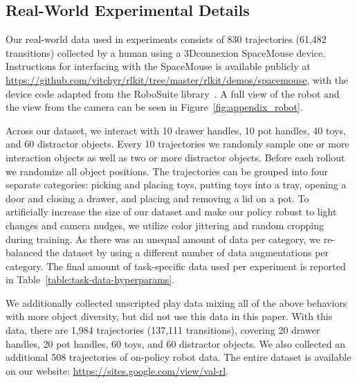\documentclass[letterpaper, 10 pt, conference]{ieeeconf}  %
\begin{document}
{ \small


}

\clearpage
\newpage

\appendix

\subsection{Real-World Experimental Details} \label{sec:appendix_real}

Our real-world data used in experiments consists of 830 trajectories (61,482 transitions) collected by a human using a 3Dconnexion SpaceMouse device. Instructions for interfacing with the SpaceMouse is available publicly at \url{https://github.com/vitchyr/rlkit/tree/master/rlkit/demos/spacemouse}, with the device code adapted from the RoboSuite library~\cite{robosuite2020}. A full view of the robot and the view from the camera can be seen in Figure~\ref{fig:appendix_robot}.

Across our dataset, we interact with 10 drawer handles, 10 pot handles, 40 toys, and 60 distractor objects. Every 10 trajectories we randomly sample one or more interaction objects as well as two or more distractor objects. Before each rollout we randomize all object positions. The trajectories can be grouped into four separate categories: picking and placing toys, putting toys into a tray, opening a door and closing a drawer, and placing and removing a lid on a pot. To artificially increase the size of our dataset and make our policy robust to light changes and camera nudges, we utilize color jittering and random cropping during training. As there was an unequal amount of data per category, we re-balanced the dataset by using a different number of data augmentations per category. The final amount of task-specific data used per experiment is reported in Table~\ref{table:task-data-hyperparams}.

We additionally collected unscripted play data mixing all of the above behaviors with more object diversity, but did not use this data in this paper. With this data, there are 1,984 trajectories (137,111 transitions), covering 20 drawer handles, 20 pot handles, 60 toys, and 60 distractor objects. We also collected an additional 508 trajectories of on-policy robot data. The entire dataset is available on our website: \url{https://sites.google.com/view/val-rl}.
\end{document}
